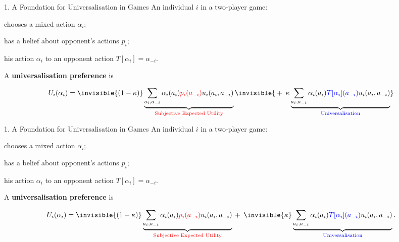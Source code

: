 \documentclass[usenames,dvipsnames,aspectratio=169,11pt]{beamer}
\begin{document}
\begin{frame}{1. A Foundation for Universalisation in Games}
	An individual \( i \) in a two-player game:

	\vfill

	\begin{wideitemize}
		\item chooses a mixed action \( \alpha_i \);
		\item has a belief about opponent's actions \( p_i \);
		\item {} his action \( \alpha_i \) to an opponent action \( T [\alpha_{i} ] = \alpha_{-i} \). \pause
	\end{wideitemize}

	\vfill

	A \textbf{universalisation preference} is

	\vfill

	\[
		\begin{aligned}
			U_i(\alpha_i) = \invisible{(1-\kappa)} \underbrace{\sum_{a_i, a_{-i}} \alpha_i(a_i) \textcolor{red}{p_{i}(a_{-i})} u_i(a_i, a_{-i})}_{\text{\textcolor{red}{Subjective Expected Utility}}} \invisible{\: + \: \: \kappa \underbrace{\sum_{a_i, a_{-i}} \alpha_i(a_i) \textcolor{blue}{T [ \alpha_i ](a_{-i})} u_i(a_i, a_{-i})}_{\text{\textcolor{blue}{Universalisation}}}}
		\end{aligned}
	\]

\end{frame}

\begin{frame}[noframenumbering]{1. A Foundation for Universalisation in Games}
	An individual \( i \) in a two-player game:

	\vfill

	\begin{wideitemize}
		\item chooses a mixed action \( \alpha_i \);
		\item has a belief about opponent's actions \( p_i \);
		\item {} his action \( \alpha_i \) to an opponent action \( T [\alpha_{i} ] = \alpha_{-i} \).
	\end{wideitemize}

	\vfill

	A \textbf{universalisation preference} is

	\vfill

	\[
		\begin{aligned}
			U_i(\alpha_i) = \invisible{(1-\kappa)} \underbrace{\sum_{a_i, a_{-i}} \alpha_i(a_i) \textcolor{red}{p_{i}(a_{-i})} u_i(a_i, a_{-i})}_{\text{\textcolor{red}{Subjective Expected Utility}}} \: + \: \: \invisible{\kappa} \underbrace{\sum_{a_i, a_{-i}} \alpha_i(a_i) \textcolor{blue}{T [ \alpha_i ](a_{-i})} u_i(a_i, a_{-i})}_{\text{\textcolor{blue}{Universalisation}}} .
		\end{aligned}
	\]

\end{frame}
\end{document}

